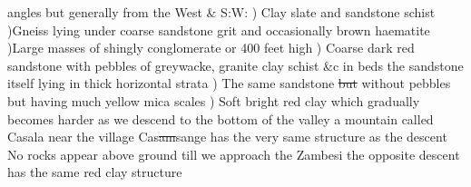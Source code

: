 \documentclass[11pt,twoside]{article}\makeatletter
\begin{document}
\newline angles but generally  \newline from the West \& S:W:\label{p9r-02} \newline  {}) Clay slate and  \newline sandstone schist  )Gneiss lying under coarse sandstone grit  \newline and occasionally brown  \newline haematite  )Large masses of  \newline shingly conglomerate   or 400 feet high\label{p9r-03} \newline  {}) Coarse dark red  \newline sandstone with pebbles  \newline of greywacke, granite  \newline clay schist \&c in beds  \newline the sandstone itself  \newline lying in thick horizontal  \newline strata  ) The same sandstone  \newline \sout{but} without pebbles but  \newline having much yellow mica scales\label{p9r-04} \newline  {}) Soft bright red  \newline clay which gradually  \newline becomes harder as  \newline we descend to the  \newline bottom of the valley  \newline a mountain called Casala near the village  \newline Cas\sout{am}sange has the very  \newline same structure as the descent\label{p9r-05} \newline  \indent No rocks  \newline appear above  \newline ground till we  \newline approach the  \newline Zambesi the opposite  \newline descent has  \newline the same red clay structure\label{p9r-06}
\end{document}
